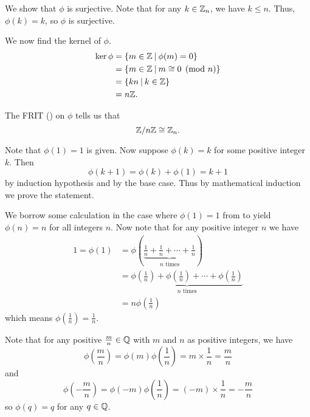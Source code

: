 \begin{questions}
    \item We show that $\phi$ is surjective. Note that for any $k \in \mathbb{Z}_n$, we have $k \leq n$. Thus, $\phi(k) = k$, so $\phi$ is surjective.
    
    We now find the kernel of $\phi$.
    \begin{align*}
        \ker\phi &= \{m \in \Z \vert \phi(m) = 0\}\\
        &= \{m \in \Z \vert m \cong 0 \pmod n\}\\
        &= \{kn \vert k \in \Z\}\\
        &= n\Z.
    \end{align*}

    The FRIT () on $\phi$ tells us that
    \[
        \mathbb{Z}/n\mathbb{Z} \cong \mathbb{Z}_n.
    \]

    \item Note that $\phi(1) = 1$ is given. Now suppose $\phi(k) = k$ for some positive integer $k$. Then
    \[
        \phi(k+1) = \phi(k) + \phi(1) = k + 1
    \]
    by induction hypothesis and by the base case. Thus by mathematical induction we prove the statement.

    \item We borrow some calculation in the case where $\phi(1) = 1$ from  to yield $\phi(n) = n$ for all integers $n$. Now note that for any positive integer $n$ we have
    \begin{align*}
        1 = \phi(1) &= \phi\left(\underbrace{\frac1n + \frac1n + \cdots + \frac1n}_{n \text{ times}}\right)\\
        &= \underbrace{\phi\left(\frac1n\right) + \phi\left(\frac1n\right) + \cdots + \phi\left(\frac1n\right)}_{n \text{ times}}\\
        &= n\phi\left(\frac1n\right)
    \end{align*}
    which means $\phi\left(\frac1n\right) = \frac1n$.

    Note that for any positive $\frac mn \in \mathbb{Q}$ with $m$ and $n$ as positive integers, we have
    \[
        \phi\left(\frac mn\right) = \phi(m)\phi\left(\frac1n\right) = m \times \frac1n = \frac mn
    \]
    and
    \[
        \phi\left(-\frac mn\right) = \phi(-m)\phi\left(\frac1n\right) = (-m) \times \frac1n = -\frac mn
    \]
    so $\phi(q) = q$ for any $q \in \mathbb{Q}$.
\end{questions}
